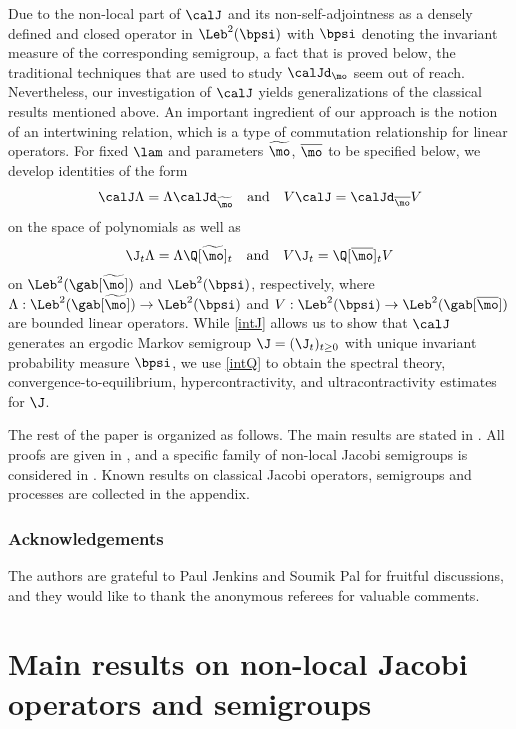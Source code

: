 Due to the non-local part of $\calJ$ and its non-self-adjointness as a densely defined and closed operator in $\Leb^2(\bpsi)$ with $\bpsi$ denoting the invariant measure of the corresponding semigroup, a fact that is proved below, the traditional techniques that are used to study $\calJd_\mo$ seem out of reach. Nevertheless, our investigation of $\calJ$ yields generalizations of the
classical results mentioned above. An important ingredient of our approach is the notion of an intertwining relation, which is a type of commutation relationship for linear operators. For fixed $\lam$ and parameters $\widetilde{\mo}$, $\overline{\mo}$ to be specified below, we develop identities of the form
\begin{equation} \label{intJ}
\calJ \Lambda = \Lambda \calJd_{\widetilde{\mo}} \quad \mbox{and} \quad V \calJ = \calJd_{\overline{\mo}} V
\end{equation}
on the space of polynomials as well as
\begin{equation} \label{intQ}
\J_t \Lambda = \Lambda \Q[\widetilde{\mo}]_t \quad \mbox{and} \quad V\J_t = \Q[\overline{\mo}]_t V
\end{equation}
on $\Leb^2(\gab[\widetilde{\mo}])$ and $\Leb^2(\bpsi)$, respectively, where $\Lambda:\Leb^2(\gab[\widetilde{\mo}]) \to \Leb^2(\bpsi)$ and $V:\Leb^2(\bpsi) \to \Leb^2(\gab[\overline{\mo}])$ are bounded linear operators.
While \eqref{intJ} allows us to show that $\calJ$ generates an ergodic Markov semigroup $\J = (\J_t)_{t \geq 0}$
with unique invariant probability measure $\bpsi$, we use \eqref{intQ} to obtain
the spectral theory, convergence-to-equilibrium, hypercontractivity, and ultracontractivity estimates for $\J$.

The rest of the paper is organized as follows. The main results are stated in . All proofs are given in , and a specific family of non-local Jacobi semigroups is considered in .
Known results on classical Jacobi operators, semigroups and processes are collected in the appendix.

\subsubsection*{Acknowledgements}
The authors are grateful to Paul Jenkins and Soumik Pal for fruitful discussions, and they would like to thank the anonymous referees for valuable comments.

\section{Main results on non-local Jacobi operators and semigroups} \label{sec:main-results}

